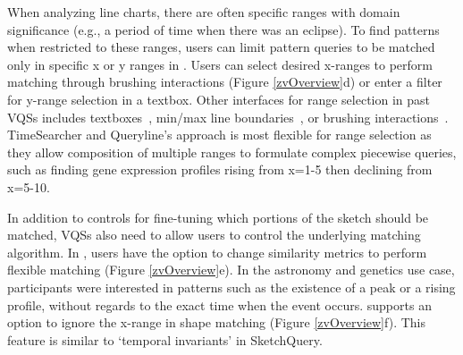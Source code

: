 \par When analyzing line charts,
there are often specific ranges with
domain significance (e.g., a period of time when there was an eclipse). 
To find patterns when restricted to these ranges, 
users can limit pattern queries 
to be matched only in specific x or y ranges in \zvpp. 
Users can select desired x-ranges 
to perform matching through brushing interactions 
(Figure \ref{zvOverview}d) 
or enter a filter for y-range selection in a textbox. 
Other interfaces for range selection in past VQSs 
includes textboxes~\cite{wattenberg2001sketching,Mannino2018}, 
min/max line boundaries~\cite{ryall2005querylines}, 
or brushing interactions~\cite{Hochheiser2001}. 
TimeSearcher and Queryline's approach is 
most flexible for range selection as 
they allow composition of multiple ranges 
to formulate complex piecewise queries, 
such as finding gene expression profiles 
rising from x=1-5 then declining from x=5-10.
\par 
In addition to controls for fine-tuning
which portions of the sketch should be matched,
VQSs also need to allow users
to control the underlying matching algorithm. 
In \zvpp, users have the option to change 
similarity metrics to perform 
flexible matching (Figure \ref{zvOverview}e). 
In the astronomy and genetics use case, 
participants were interested in patterns 
such as the existence of a peak or a rising profile, 
without regards to the exact time when the event occurs. 
\zvpp supports an option to ignore 
the x-range in shape matching (Figure \ref{zvOverview}f). 
This feature is similar to `temporal invariants' in SketchQuery.


